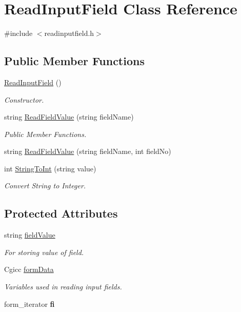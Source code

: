 \hypertarget{classReadInputField}{\section{Read\-Input\-Field Class Reference}
\label{classReadInputField}
}


{\ttfamily \#include $<$readinputfield.\-h$>$}

\subsection*{Public Member Functions}
\begin{DoxyCompactItemize}
\item 
\hyperlink{classReadInputField_aae743343381035c28a3a0111fc353c7f}{Read\-Input\-Field} ()
\begin{DoxyCompactList}\small\item\em Constructor. \end{DoxyCompactList}\item 
string \hyperlink{classReadInputField_a7f6e49b47412649644cc644927ccc682}{Read\-Field\-Value} (string field\-Name)
\begin{DoxyCompactList}\small\item\em Public Member Functions. \end{DoxyCompactList}\item 
string \hyperlink{classReadInputField_accf7ceba77721a35968c69268e4e559e}{Read\-Field\-Value} (string field\-Name, int field\-No)
\item 
int \hyperlink{classReadInputField_a567466724dfe4f76bd599bde7c565f47}{String\-To\-Int} (string value)
\begin{DoxyCompactList}\small\item\em Convert String to Integer. \end{DoxyCompactList}\end{DoxyCompactItemize}
\subsection*{Protected Attributes}
\begin{DoxyCompactItemize}
\item 
string \hyperlink{classReadInputField_a0d95496b5fc8fb4badd4af19492182ae}{field\-Value}
\begin{DoxyCompactList}\small\item\em For storing value of field. \end{DoxyCompactList}\item 
Cgicc \hyperlink{classReadInputField_a1e4ebac8979fd9b2771320d669fce5fc}{form\-Data}
\begin{DoxyCompactList}\small\item\em Variables used in reading input fields. \end{DoxyCompactList}\item 
\hypertarget{classReadInputField_ae252dc321be04c2c1afa6928ad16a45d}{form\-\_\-iterator {\bfseries fi}}\label{classReadInputField_ae252dc321be04c2c1afa6928ad16a45d}

\end{DoxyCompactItemize}


